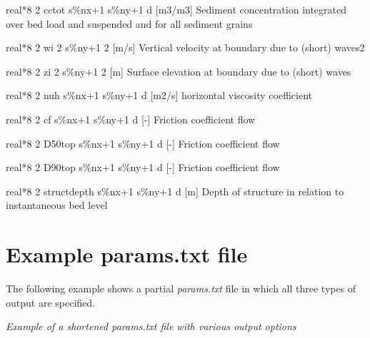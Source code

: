 real*8  2  cctot     s\%nx+1 s\%ny+1 d  [m3/m3]   Sediment concentration integrated over bed load and suspended and for all sediment grains

real*8  2  wi        2      s\%ny+1 2  [m/s]   Vertical velocity at boundary due to (short) waves2

real*8  2  zi        2      s\%ny+1 2  [m]     Surface elevation at boundary due to (short) waves

real*8  2  nuh       s\%nx+1 s\%ny+1 d  [m2/s] horizontal viscosity coefficient 

real*8  2  cf        s\%nx+1 s\%ny+1 d  [-] Friction coefficient flow

real*8  2  D50top    s\%nx+1 s\%ny+1 d  [-] Friction coefficient flow

real*8  2  D90top    s\%nx+1 s\%ny+1 d  [-] Friction coefficient flow

real*8  2  structdepth    s\%nx+1 s\%ny+1 d  [m] Depth of structure in relation to instantaneous bed level




\section{Example params.txt file}

The following example shows a partial \textit{params.txt} file in which all three types of output are specified.

\textit{Example of a shortened params.txt file with various output options}

